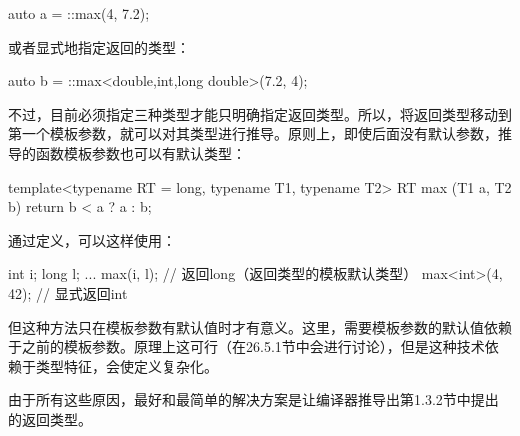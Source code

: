 \begin{cpp}
auto a = ::max(4, 7.2);
\end{cpp}

或者显式地指定返回的类型：

\begin{cpp}
auto b = ::max<double,int,long double>(7.2, 4);
\end{cpp}

不过，目前必须指定三种类型才能只明确指定返回类型。所以，将返回类型移动到第一个模板参数，就可以对其类型进行推导。原则上，即使后面没有默认参数，推导的函数模板参数也可以有默认类型：

\begin{cpp}
template<typename RT = long, typename T1, typename T2>
RT max (T1 a, T2 b)
{
	return b < a ? a : b;
}
\end{cpp}

通过定义，可以这样使用：

\begin{cpp}
int i;
long l;
...
max(i, l); // 返回long（返回类型的模板默认类型）
max<int>(4, 42); // 显式返回int
\end{cpp}

但这种方法只在模板参数有默认值时才有意义。这里，需要模板参数的默认值依赖于之前的模板参数。原理上这可行（在26.5.1节中会进行讨论），但是这种技术依赖于类型特征，会使定义复杂化。

由于所有这些原因，最好和最简单的解决方案是让编译器推导出第1.3.2节中提出的返回类型。
